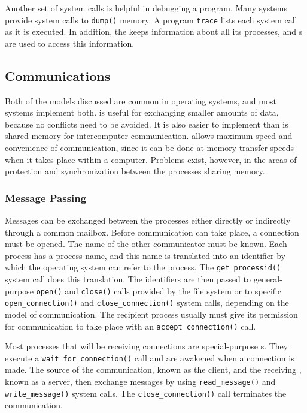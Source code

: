 Another set of system calls is helpful in debugging a program.
Many systems provide system calls to \texttt{dump()} memory.
A program \texttt{trace} lists each system call as it is executed.
In addition, the  keeps information about all its processes, and s are used to access this information.

\subsection{Communications}\label{subsec:Communications}
Both of the models discussed are common in operating systems, and most systems implement both.
 is useful for exchanging smaller amounts of data, because no conflicts need to be avoided.
It is also easier to implement than is shared memory for intercomputer communication.
 allows maximum speed and convenience of communication, since it can be done at memory transfer speeds when it takes place within a computer.
Problems exist, however, in the areas of protection and synchronization between the processes sharing memory.

\subsubsection{Message Passing}\label{subsubsec:Message_Passing}
Messages can be exchanged between the processes either directly or indirectly through a common mailbox.
Before communication can take place, a connection must be opened.
The name of the other communicator must be known.
Each process has a process name, and this name is translated into an identifier by which the operating system can refer to the process.
The \texttt{get_processid()} system call does this translation.
The identifiers are then passed to general-purpose \texttt{open()} and \texttt{close()} calls provided by the file system or to specific \texttt{open_connection()} and \texttt{close_connection()} system calls, depending on the model of communication.
The recipient process usually must give its permission for communication to take place with an \texttt{accept_connection()} call.

Most processes that will be receiving connections are special-purpose s.
They execute a \texttt{wait_for_connection()} call and are awakened when a connection is made.
The source of the communication, known as the client, and the receiving , known as a server, then exchange messages by using \texttt{read_message()} and \texttt{write_message()} system calls.
The \texttt{close_connection()} call terminates the communication.

